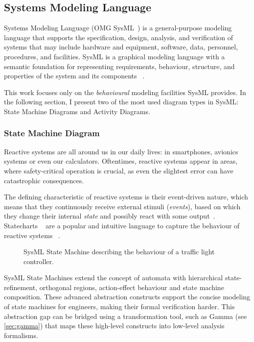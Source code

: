 \subsection{Systems Modeling Language}\label{ssec:sysml}

Systems Modeling Language (OMG SysML~\cite{omg_sysml}) is a general-purpose modeling language that supports the specification, design, analysis, and verification of systems that may include hardware and equipment, software, data, personnel, procedures, and facilities. SysML is a graphical modeling language with a semantic foundation for representing requirements, behaviour, structure, and properties of the system and its components ~\cite{sysml_practical_guide}.

This work focuses only on the \emph{behavioural} modeling facilities SysML provides. In the following section, I present two of the most used diagram types in SysML: State Machine Diagrams and Activity Diagrams.

\subsubsection*{State Machine Diagram}

Reactive systems are all around us in our daily lives: in smartphones, avionics systems or even our calculators. Oftentimes, reactive systems appear in areas, where safety-critical operation is crucial, as even the slightest error can have catastrophic consequences. 

The defining characteristic of reactive systems is their event-driven nature, which means that they continuously receive external stimuli (\emph{events}), based on which they change their internal \emph{state} and possibly react with some output~\cite{10.1007/978-3-642-82453-1_17}. Statecharts ~\cite{HAREL1987231} are a popular and intuitive language to capture the behaviour of reactive systems ~\cite{10.1145/3417990.3421407, 10.1007/978-3-319-11653-2_10}.

\begin{figure}[!ht]
	\centering
	
	\caption{SysML State Machine describing the behaviour of a traffic light controller.}
	\label{fig:sysml_state_machine}
\end{figure}

SysML State Machines extend the concept of automata with hierarchical state-refinement, orthogonal regions, action-effect behaviour and state machine composition. These advanced abstraction constructs support the concise modeling of state machines for engineers, making their formal verification harder. This abstraction gap can be bridged using a transformation tool, such as Gamma (see \autoref{sec:gamma}) that maps these high-level constructs into low-level analysis formalisms. 

